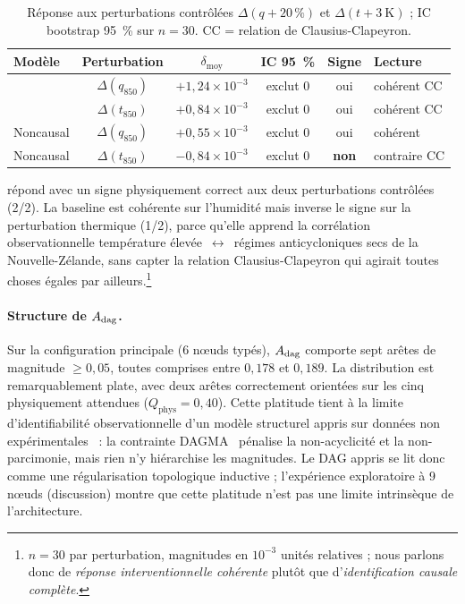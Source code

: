 \begin{table}[ht]
  \centering
  \small
  \caption[Réponse aux perturbations contrôlées]{Réponse aux perturbations contrôlées $\Delta(q +20\,\%)$ et $\Delta(t +3~\mathrm{K})$ ; IC bootstrap 95~\% sur $n = 30$. CC = relation de Clausius-Clapeyron.}
  \label{tab:exp-res-int}
  \begin{tabularx}{\linewidth}{l c c c c X}
    \toprule
    \textbf{Modèle} & \textbf{Perturbation} & $\delta_{\mathrm{moy}}$ & \textbf{IC 95~\%} & \textbf{Signe} & \textbf{Lecture} \\
    \midrule
    \Oracle{} & $\Delta(q_{850})$ & $+1{,}24 \times 10^{-3}$ & exclut 0 & oui & cohérent CC \\
    \Oracle{} & $\Delta(t_{850})$ & $+0{,}84 \times 10^{-3}$ & exclut 0 & oui & cohérent CC \\
    Noncausal & $\Delta(q_{850})$ & $+0{,}55 \times 10^{-3}$ & exclut 0 & oui & cohérent \\
    Noncausal & $\Delta(t_{850})$ & $-0{,}84 \times 10^{-3}$ & exclut 0 & \textbf{non} & contraire CC \\
    \bottomrule
  \end{tabularx}
\end{table}

\Oracle{} répond avec un signe physiquement correct aux deux perturbations contrôlées (2/2). La baseline est cohérente sur l'humidité mais inverse le signe sur la perturbation thermique (1/2), parce qu'elle apprend la corrélation observationnelle température élevée~$\leftrightarrow$~régimes anticycloniques secs de la Nouvelle-Zélande, sans capter la relation Clausius-Clapeyron qui agirait toutes choses égales par ailleurs.\footnote{$n=30$ par perturbation, magnitudes en $10^{-3}$ unités relatives ; nous parlons donc de \emph{réponse interventionnelle cohérente} plutôt que d'\emph{identification causale complète}.}

\paragraph{Structure de $A_{\mathrm{dag}}$.} Sur la configuration principale (6 nœuds typés), $A_{\mathrm{dag}}$ comporte sept arêtes de magnitude $\geq 0{,}05$, toutes comprises entre $0{,}178$ et $0{,}189$. La distribution est remarquablement plate, avec deux arêtes correctement orientées sur les cinq physiquement attendues ($Q_{\mathrm{phys}}=0{,}40$). Cette platitude tient à la limite d'identifiabilité observationnelle d'un modèle structurel appris sur données non expérimentales~\cite{pearl_causality_2009} : la contrainte DAGMA~\cite{bello_dagma_2022} pénalise la non-acyclicité et la non-parcimonie, mais rien n'y hiérarchise les magnitudes. Le DAG appris se lit donc comme une régularisation topologique inductive ; l'expérience exploratoire à 9 nœuds (discussion) montre que cette platitude n'est pas une limite intrinsèque de l'architecture.

